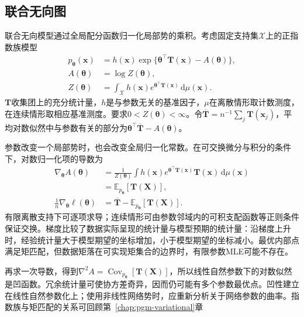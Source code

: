 \subsection{联合无向图}
\label{sec:pgm-parameter-learning-undirected}

联合无向模型通过全局配分函数归一化局部势的乘积。考虑固定支持集$\mathcal{X}$上的正指数族模型
\begin{equation}
  \begin{aligned}
    p_{\bm{\theta}}(\bm{x})
      &=h(\bm{x})
        \exp\{\bm{\theta}^\top\bm{T}(\bm{x})-A(\bm{\theta})\},\\
    A(\bm{\theta})&=\log Z(\bm{\theta}),\\
    Z(\bm{\theta})
      &=\int_{\mathcal{X}}h(\bm{x})
        e^{\bm{\theta}^\top\bm{T}(\bm{x})}\,\mathrm{d}\mu(\bm{x}).
  \end{aligned}
  \label{eq:pgm-parameter-learning-exponential-model}
\end{equation}
$\bm{T}$收集团上的充分统计量，$h$是与参数无关的基准因子，$\mu$在离散情形取计数测度，在连续情形取相应基准测度。要求$0<Z(\bm{\theta})<\infty$。令$\overline{\bm{T}}=n^{-1}\sum_j\bm{T}(\bm{x}_j)$，平均对数似然中与参数有关的部分为$\bm{\theta}^\top\overline{\bm{T}}-A(\bm{\theta})$。

参数改变一个局部势时，也会改变全局归一化常数。在可交换微分与积分的条件下，对数归一化项的导数为
\begin{equation}
  \begin{aligned}
    \nabla_{\bm{\theta}} A(\bm{\theta})
      &=\frac{1}{Z(\bm{\theta})}
        \int h(\bm{x})e^{\bm{\theta}^\top\bm{T}(\bm{x})}
             \bm{T}(\bm{x})\,\mathrm{d}\mu(\bm{x})\\
      &=\mathbb{E}_{p_{\bm{\theta}}}[\bm{T}(\bm{X})],\\
    \frac{1}{n}\nabla_{\bm{\theta}}\ell(\bm{\theta})
      &=\overline{\bm{T}}
        -\mathbb{E}_{p_{\bm{\theta}}}[\bm{T}(\bm{X})].
  \end{aligned}
  \label{eq:pgm-parameter-learning-moment-gradient}
\end{equation}
有限离散支持下可逐项求导；连续情形可由参数邻域内的可积支配函数等正则条件保证交换。梯度比较了数据实际呈现的统计量与模型预期的统计量：沿梯度上升时，经验统计量大于模型期望的坐标增加，小于模型期望的坐标减小。最优内部点满足矩匹配，但数据矩落在可实现矩集合的边界时，有限参数MLE可能不存在。

再求一次导数，得到$\nabla^2A=\operatorname{Cov}_{p_{\bm{\theta}}}[\bm{T}(\bm{X})]$，所以线性自然参数下的对数似然是凹函数。冗余统计量可使协方差奇异，因而仍可能有多个参数最优点。凹性建立在线性自然参数化上；使用非线性网络势时，应重新分析关于网络参数的曲率。指数族与矩匹配的关系可回顾第~\ref{chap:pgm-variational}章

